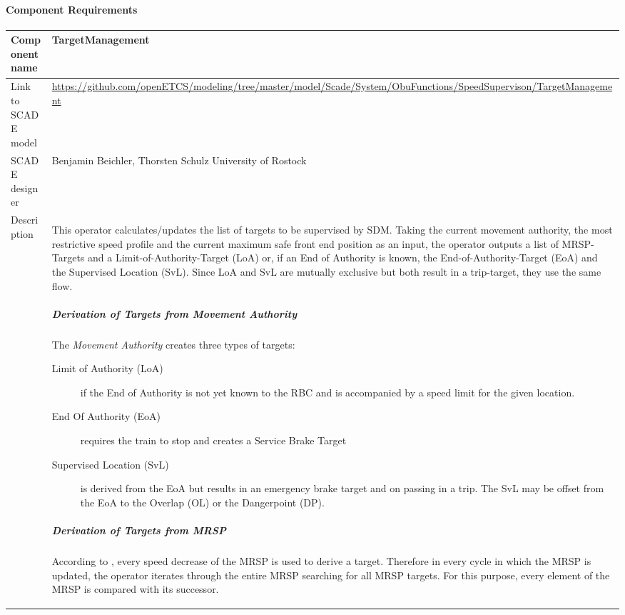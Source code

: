 
\paragraph{Component Requirements}

\begin{longtable}{p{}p{}}
\toprule
Component name			& TargetManagement \\
\midrule
Link to SCADE model		& {\footnotesize \url{https://github.com/openETCS/modeling/tree/master/model/Scade/System/ObuFunctions/SpeedSupervison/TargetManagement}} \\
\midrule
SCADE designer			& Benjamin Beichler, Thorsten Schulz University of Rostock \\
\midrule
Description				& This operator calculates/updates the list of targets to be supervised by SDM. Taking the current movement authority, the most restrictive speed profile and the current maximum safe front end position as an input, the operator outputs a list of MRSP-Targets and a Limit-of-Authority-Target (LoA) or, if an End of Authority is known, the End-of-Authority-Target (EoA) and the Supervised Location (SvL). Since LoA and SvL are mutually exclusive but both result in a trip-target, they use the same flow.

\subparagraph*{Derivation of Targets from Movement Authority}
The \emph{Movement Authority} creates three types of targets:
\begin{description}
\item[Limit of Authority (LoA)] if the End of Authority is not yet known to the RBC and is accompanied by a speed limit for the given location.
\item[End Of Authority (EoA)] requires the train to stop and creates a Service Brake Target
\item[Supervised Location (SvL)] is derived from the EoA but results in an emergency brake target and on passing in a trip. The SvL may be offset from the EoA to the Overlap (OL) or the Dangerpoint (DP).
\end{description}

\subparagraph*{Derivation of Targets from MRSP}
According to \cite[Chapt.~3.13.8.2]{subset-026}, every speed decrease of the MRSP is used to derive a target. Therefore in every cycle in which the MRSP is updated, the operator iterates through the entire MRSP searching for all MRSP targets. For this purpose, every element of the MRSP is compared with its successor.


\end{longtable}
